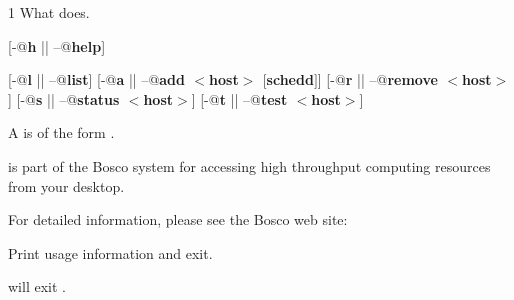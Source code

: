 \begin{ManPage}{\label{man-bosco-cluster}}{1}
{What  does. }


\Synopsis {}
[\verb@-@\textbf{h} || \verb@--@\textbf{help}]

[\verb@-@\textbf{l} || \verb@--@\textbf{list}]
[\verb@-@\textbf{a} || \verb@--@\textbf{add $<$host$>$ $[$schedd$]$}]
[\verb@-@\textbf{r} || \verb@--@\textbf{remove $<$host$>$}]
[\verb@-@\textbf{s} || \verb@--@\textbf{status $<$host$>$}]
[\verb@-@\textbf{t} || \verb@--@\textbf{test $<$host$>$}]

\Description

A  is of the form .

 is part of the Bosco system for accessing high
throughput computing resources from your desktop.

For detailed information, please see the Bosco web site:

\begin{Options}
   {Print usage information and exit.}

\end{Options}

\ExitStatus

 will exit \Dots.

\end{ManPage}

